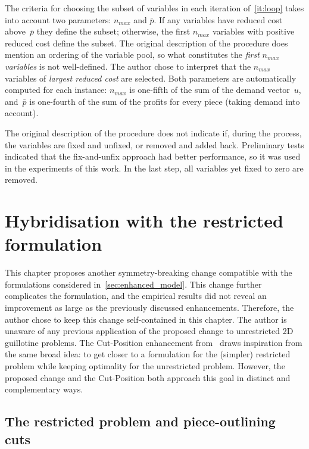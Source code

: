 \documentclass[ppgc,tese,english,formais,babel]{iiufrgs}
\begin{document}
The criteria for choosing the subset of variables in each iteration of~\autoref{it:loop} takes into account two parameters: \(n_{max}\) and \(\bar{p}\). If any variables have reduced cost above~\(\bar{p}\) they define the subset; otherwise, the first \(n_{max}\) variables with positive reduced cost define the subset. The original description of the procedure does mention an ordering of the variable pool, so what constitutes the \emph{first} \(n_{max}\) \emph{variables} is not well-defined. The author chose to interpret that the \(n_{max}\) variables of \emph{largest reduced cost} are selected. Both parameters are automatically computed for each instance: \(n_{max}\) is one-fifth of the sum of the demand vector~\(u\), and~\(\bar{p}\) is one-fourth of the sum of the profits for every piece (taking demand into account).

The original description of the procedure does not indicate if, during the process, the variables are fixed and unfixed, or removed and added back.
Preliminary tests indicated that the fix-and-unfix approach had better performance, so it was used in the experiments of this work.
In the last step, all variables yet fixed to zero are removed.

\chapter{Hybridisation with the restricted formulation}

This chapter proposes another symmetry-breaking change compatible with the formulations considered in~\cref{sec:enhanced_model}.
This change further complicates the formulation, and the empirical results did not reveal an improvement as large as the previously discussed enhancements.
Therefore, the author chose to keep this change self-contained in this chapter.
The author is unaware of any previous application of the proposed change to unrestricted 2D guillotine problems.
The Cut-Position enhancement from~\citet{furini:2016} draws inspiration from the same broad idea: to get closer to a formulation for the (simpler) restricted problem while keeping optimality for the unrestricted problem.
However, the proposed change and the Cut-Position both approach this goal in distinct and complementary ways.

\section{The restricted problem and piece-outlining cuts}
\end{document}
